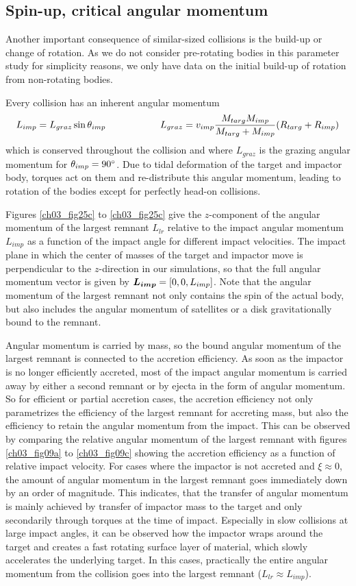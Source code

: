 \subsection{Spin-up, critical angular momentum}
Another important consequence of similar-sized collisions is the build-up or change of rotation. As we do not consider pre-rotating bodies in this parameter study for simplicity reasons, we only have data on the initial build-up of rotation from non-rotating bodies.

Every collision has an inherent angular momentum 
\begin{align}
L_{imp} = L_{graz} \sin{ \theta_{imp}} \hspace{2.0cm} L_{graz} = v_{imp} \frac{M_{targ} M_{imp}}{M_{targ} + M_{imp}} (R_{targ} + R_{imp})
\end{align}
which is conserved throughout the collision and where $L_{graz}$ is the grazing angular momentum for $\theta_{imp} = 90 ^\circ$. Due to tidal deformation of the target and impactor body, torques act on them and re-distribute this angular momentum, leading to rotation of the bodies except for perfectly head-on collisions.

Figures \ref{ch03_fig25c} to \ref{ch03_fig25c} give the $z$-component of the angular momentum of the largest remnant $L_{lr}$ relative to the impact angular momentum $L_{imp}$ as a function of the impact angle for different impact velocities. The impact plane in which the center of masses of the target and impactor move is perpendicular to the $z$-direction in our simulations, so that the full angular momentum vector is given by $\boldsymbol{L_{imp}} = [0, 0, L_{imp} ]$. Note that the angular momentum of the largest remnant not only contains the spin of the actual body, but also includes the angular momentum of satellites or a disk gravitationally bound to the remnant.

Angular momentum is carried by mass, so the bound angular momentum of the largest remnant is connected to the accretion efficiency. As soon as the impactor is no longer efficiently accreted, most of the impact angular momentum is carried away by either a second remnant or by ejecta in the form of angular momentum. So for efficient or partial accretion cases, the accretion efficiency not only parametrizes the efficiency of the largest remnant for accreting mass, but also the efficiency to retain the angular momentum from the impact. This can be observed by comparing the relative angular momentum of the largest remnant with figures \ref{ch03_fig09a} to \ref{ch03_fig09c} showing the accretion efficiency as a function of relative impact velocity. For cases where the impactor is not accreted and $\xi \approx 0$, the amount of angular momentum in the largest remnant goes immediately down by an order of magnitude. This indicates, that the transfer of angular momentum is mainly achieved by transfer of impactor mass to the target and only secondarily through torques at the time of impact. Especially in slow collisions at large impact angles, it can be observed how the impactor wraps around the target and creates a fast rotating surface layer of material, which slowly accelerates the underlying target. In this cases, practically the entire angular momentum from the collision goes into the largest remnant ($L_{lr} \approx L_{imp}$).

